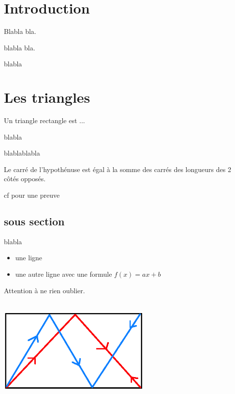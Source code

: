 \section{Introduction}
Blabla bla.\bigskip

blabla bla.\bigskip

blabla

\section{Les triangles}

\begin{definition}
Un triangle rectangle est ...
\end{definition}

blabla \bigskip

blablablabla

\begin{theorem}[Pythagore]
Le carré de l'hypothénuse est égal à la somme des carrés des longueurs des 2 côtés opposés.
\end{theorem}

cf \cite{tao} pour une preuve

\subsection{sous section}

blabla
\begin{itemize}
\item une ligne
\item une autre ligne avec une formule $f(x) = ax+b$
\end{itemize}

\begin{remark}
Attention à ne rien oublier.
\end{remark}

\begin{center}
\includegraphics[width=3in,height=2.09in, clip]{images/billard.png}
\end{center}

